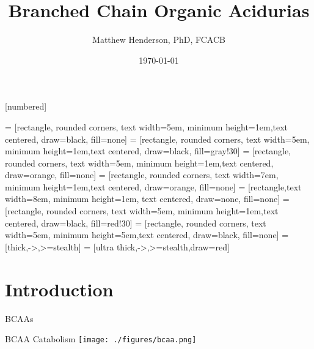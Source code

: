 \documentclass[presentation, smaller]{beamer}
\author{Matthew Henderson, PhD, FCACB}
\date{\today}
\title{Branched Chain Organic Acidurias}
\institute[NSO]{Newborn Screening Ontario | The University of Ottawa}
\begin{document}
\maketitle

\vspace{220pt}
\beamertemplatenavigationsymbolsempty
{}[numbered]

 = [rectangle, rounded corners, text width=5em, minimum height=1em,text centered, draw=black, fill=none]
 = [rectangle, rounded corners, text width=5em, minimum height=1em,text centered, draw=black, fill=gray!30]
 = [rectangle, rounded corners, text width=5em, minimum height=1em,text centered, draw=orange, fill=none]
 = [rectangle, rounded corners, text width=7em, minimum height=1em,text centered, draw=orange, fill=none]
 = [rectangle,text width=8em, minimum height=1em, text centered, draw=none, fill=none]
 = [rectangle, rounded corners, text width=5em, minimum height=1em,text centered, draw=black, fill=red!30]
 = [rectangle, rounded corners, text width=5em, minimum height=5em,text centered, draw=black, fill=none]
 = [thick,->,>=stealth]
 = [ultra thick,->,>=stealth,draw=red]

\section{Introduction}
\label{sec:orgheadline9}
\begin{frame}[label={sec:orgheadline1}]{BCAAs}
\centering
{}
\end{frame}

\begin{frame}[label={sec:orgheadline2}]{BCAA Catabolism}
\centering
\texttt{[image: ./figures/bcaa.png]}
\end{frame}
\end{document}
